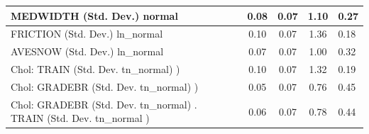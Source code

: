 \begin{table}
\begin{center}
\begin{tabular}{|l|l|c|c|c|l|}
			\hline
			MEDWIDTH (Std. Dev.) normal &  & 0.08 & 0.07 & 1.10 & 0.27 \\
			\hline
			FRICTION (Std. Dev.) ln_normal &  & 0.10 & 0.07 & 1.36 & 0.18 \\
			\hline
			AVESNOW (Std. Dev.) ln_normal &  & 0.07 & 0.07 & 1.00 & 0.32 \\
			\hline
			 Chol: TRAIN (Std. Dev. tn_normal) ) &  & 0.10 & 0.07 & 1.32 & 0.19 \\
			\hline
			 Chol: GRADEBR (Std. Dev. tn_normal) ) &  & 0.05 & 0.07 & 0.76 & 0.45 \\
			\hline
			 Chol: GRADEBR (Std. Dev. tn_normal) . TRAIN (Std. Dev.   tn_normal ) &  & 0.06 & 0.07 & 0.78 & 0.44 \\
			\hline
		\end{tabular}
	\end{center}
\end{table}